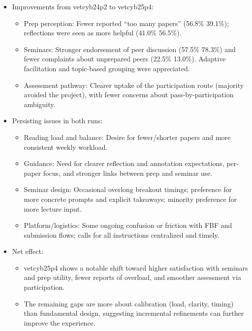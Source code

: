 \documentclass[a4paper]{report}
\begin{document}
\begin{itemize}
  \item Improvements from vetcyb24p2 to vetcyb25p4:
    \begin{itemize}
      \item Prep perception: Fewer reported “too many papers” (56.8\% \textrightarrow{} 39.1\%); reflections were seen as more helpful (41.0\% \textrightarrow{} 56.5\%).
      \item Seminars: Stronger endorsement of peer discussion (57.5\% \textrightarrow{} 78.3\%) and fewer complaints about unprepared peers (22.5\% \textrightarrow{} 13.0\%). Adaptive facilitation and topic-based grouping were appreciated.
      \item Assessment pathway: Clearer uptake of the participation route (majority avoided the project), with fewer concerns about pass-by-participation ambiguity.
    \end{itemize}
  \item Persisting issues in both runs:
    \begin{itemize}
      \item Reading load and balance: Desire for fewer/shorter papers and more consistent weekly workload.
      \item Guidance: Need for clearer reflection and annotation expectations, per-paper focus, and stronger links between prep and seminar use.
      \item Seminar design: Occasional overlong breakout timings; preference for more concrete prompts and explicit takeaways; minority preference for more lecture input.
      \item Platform/logistics: Some ongoing confusion or friction with FBF and submission flows; calls for all instructions centralized and timely.
    \end{itemize}
  \item Net effect:
    \begin{itemize}
      \item vetcyb25p4 shows a notable shift toward higher satisfaction with seminars and prep utility, fewer reports of overload, and smoother assessment via participation.
      \item The remaining gaps are more about calibration (load, clarity, timing) than fundamental design, suggesting incremental refinements can further improve the experience.
    \end{itemize}
\end{itemize}
\end{document}
